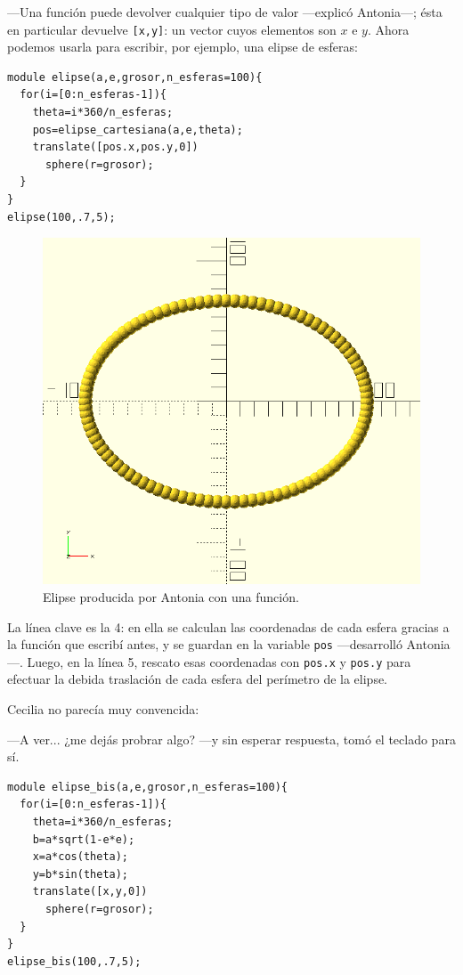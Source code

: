 ---Una función puede devolver cualquier tipo de valor ---ex\-pli\-có
Antonia---; ésta en particular devuelve \lstinline![x,y]!: un vector
cuyos elementos son $x$ e $y$. Ahora podemos usarla para escribir, por
ejemplo, una elipse de esferas:

    \begin{lstlisting}
module elipse(a,e,grosor,n_esferas=100){
  for(i=[0:n_esferas-1]){
    theta=i*360/n_esferas;
    pos=elipse_cartesiana(a,e,theta);
    translate([pos.x,pos.y,0])
      sphere(r=grosor);
  }
}
elipse(100,.7,5);
    \end{lstlisting}

    \begin{figure}[ht]
      \centering
      \includegraphics[width=.5\textwidth]{imagenes/elipse-funcion}
      \caption{Elipse producida por Antonia con una función.}
      \label{fig:elipse-funcion}
    \end{figure}


    \guillemotright La línea clave es la 4: en ella se calculan las
    coordenadas de cada esfera gracias a la función que escribí antes,
    y se guardan en la variable \lstinline!pos!  ---desarrolló
    Antonia---. Luego, en la línea 5, rescato esas coordenadas con
    \lstinline!pos.x! y \lstinline!pos.y! para efectuar la debida
    traslación de cada esfera del perímetro de la elipse.

    Cecilia no parecía muy convencida:

    ---A ver... ¿me dejás probrar algo? ---y sin esperar respuesta,
    tomó el teclado para sí.

   
    \begin{lstlisting}
module elipse_bis(a,e,grosor,n_esferas=100){
  for(i=[0:n_esferas-1]){
    theta=i*360/n_esferas;
    b=a*sqrt(1-e*e);
    x=a*cos(theta);
    y=b*sin(theta);
    translate([x,y,0])
      sphere(r=grosor);
  }
}
elipse_bis(100,.7,5);
\end{lstlisting}

